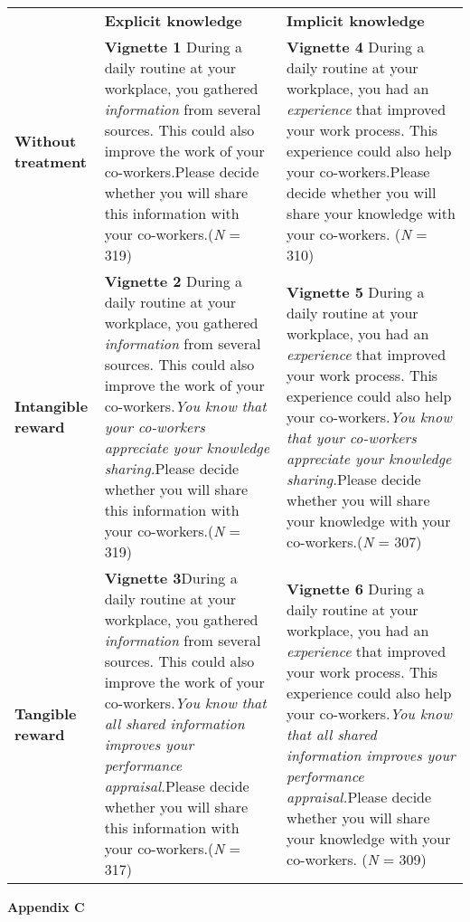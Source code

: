 \documentclass{article}
\begin{document}
\begin{table}

  
\begin{tabular}{l  l  l}

  \textbf{} & \textbf{Explicit knowledge } & \textbf{Implicit knowledge }\\
\textbf{Without treatment} & \textbf{Vignette 1} During a daily routine at your workplace, you gathered \emph{information} from several sources. This could also improve the work of your co-workers.Please decide whether you will share this information with your co-workers.(\emph{N} = 319) & \textbf{Vignette 4} During a daily routine at your workplace, you had an \emph{experience} that improved your work process. This experience could also help your co-workers.Please decide whether you will share your knowledge with your co-workers. (\emph{N} = 310)\\
\textbf{Intangible reward} & \textbf{Vignette 2} During a daily routine at your workplace, you gathered \emph{information} from several sources. This could also improve the work of your co-workers.\emph{}\emph{You know that your co-workers appreciate your knowledge sharing.}\emph{}Please decide whether you will share this information with your co-workers.(\emph{N} = 319) & \textbf{Vignette 5} During a daily routine at your workplace, you had an \emph{experience} that improved your work process. This experience could also help your co-workers.\emph{}\emph{You know that your co-workers appreciate your knowledge sharing.}\emph{}Please decide whether you will share your knowledge with your co-workers.(\emph{N} = 307)\\
\textbf{Tangible reward} & \textbf{Vignette 3}During a daily routine at your workplace, you gathered \emph{information} from several sources. This could also improve the work of your co-workers.\emph{}\emph{You know that all shared information improves your performance appraisal.}Please decide whether you will share this information with your co-workers.(\emph{N} = 317) & \textbf{Vignette 6} During a daily routine at your workplace, you had an \emph{experience} that improved your work process. This experience could also help your co-workers.\emph{}\emph{You know that all shared information improves your performance appraisal.}Please decide whether you will share your knowledge with your co-workers. (\emph{N} = 309)\\


\end{tabular}


\end{table}
\textbf{Appendix C}
\end{document}
